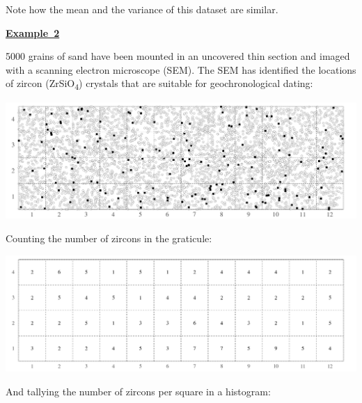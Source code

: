 Note how the mean and the variance of this dataset are similar.\medskip

\noindent\textbf{\underline{Example~2}}\medskip

5000 grains of sand have been mounted in an uncovered thin section and
imaged with a scanning electron microscope (SEM). The SEM has
identified the locations of zircon (ZrSiO\textsubscript{4}) crystals
that are suitable for geochronological dating:

\noindent\includegraphics[width=\textwidth]{../figures/zircons.pdf}
\begingroup {}
\label{fig:zircons}
\endgroup

Counting the number of zircons in the graticule:

\noindent\includegraphics[width=\textwidth]{../figures/zirconcounts.pdf}
\begingroup {}
\label{fig:zirconcounts}\endgroup

And tallying the number of zircons per square in a histogram:

